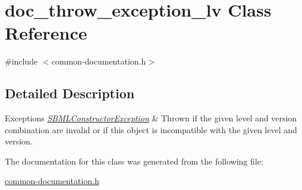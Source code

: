 \hypertarget{classdoc__throw__exception__lv}{}\section{doc\+\_\+throw\+\_\+exception\+\_\+lv Class Reference}
\label{classdoc__throw__exception__lv}


{\ttfamily \#include $<$common-\/documentation.\+h$>$}



\subsection{Detailed Description}

\begin{DoxyExceptions}{Exceptions}
{\em \hyperlink{class_s_b_m_l_constructor_exception}{S\+B\+M\+L\+Constructor\+Exception}} & Thrown if the given {\ttfamily level} and {\ttfamily version} combination are invalid or if this object is incompatible with the given level and version. \\
\hline
\end{DoxyExceptions}


The documentation for this class was generated from the following file\+:\begin{DoxyCompactItemize}
\item 
\hyperlink{common-documentation_8h}{common-\/documentation.\+h}\end{DoxyCompactItemize}

